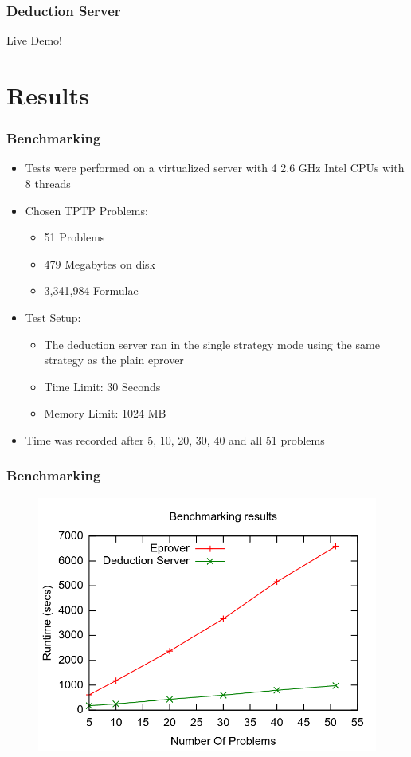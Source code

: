 \documentclass[10pt]{beamer}
\begin{document}
\begin{frame}[fragile]
  \frametitle{Deduction Server}
  \begin{center}
  Live Demo!
  \end{center}
\end{frame}

\section{Results}
\begin{frame}[fragile]
  \frametitle{Benchmarking}
  \begin{itemize}[<+- | alert@+>]
    \item Tests were performed on a virtualized server with 4 2.6 GHz Intel CPUs with 8 threads
    \item Chosen TPTP Problems:
      \begin{itemize}
        \item 51 Problems
        \item 479 Megabytes on disk
        \item 3,341,984 Formulae
      \end{itemize}
    \item Test Setup:
      \begin{itemize}
        \item The deduction server ran in the single strategy mode using the same strategy as the plain eprover
        \item Time Limit: 30 Seconds
        \item Memory Limit: 1024 MB
      \end{itemize}
    \item Time was recorded after 5, 10, 20, 30, 40 and all 51 problems
  \end{itemize}
\end{frame}


\begin{frame}[fragile]
  \frametitle{Benchmarking}
\begin{figure} \includegraphics[width=\linewidth,height=0.9\textheight,keepaspectratio]{imgs/BenchmarkingResults.png} \end{figure}
\end{frame}
\end{document}
